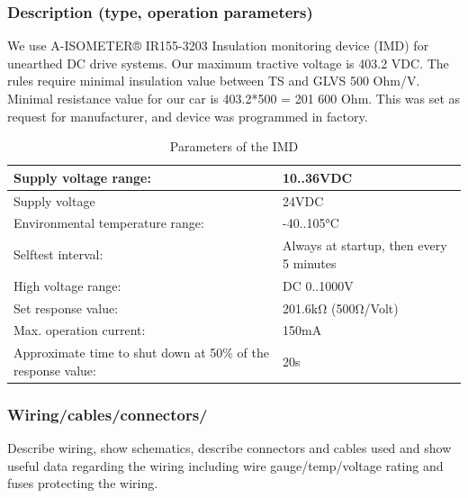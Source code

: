 \subsubsection{Description (type, operation parameters)}

We use A-ISOMETER® IR155-3203 Insulation monitoring device (IMD) for unearthed DC drive systems. Our maximum tractive voltage is 403.2 VDC. The rules require minimal insulation value between TS and GLVS 500 Ohm/V. Minimal resistance value for our car is 403.2*500 = 201 600 Ohm. This was set as request for manufacturer, and device was programmed in factory.
\begin{table}[H]
	\centering
	\caption{Parameters of the IMD}
	\begin{tabularx}{\textwidth}{|X|l|}
	 \hline	Supply voltage range: & 10..36VDC \\[.4cm]
	 \hline	Supply voltage & 24VDC \\[.4cm]
	 \hline	Environmental temperature range: & -40..105°C \\[.4cm]
	 \hline	Selftest interval: & Always at startup, then every 5 minutes \\[.4cm]
	 \hline	High voltage range: & DC 0..1000V \\[.4cm]
	 \hline	Set response value: & 201.6kΩ (500Ω/Volt) \\[.4cm]
	 \hline	Max. operation current: & 150mA \\[.4cm]
	 \hline	Approximate time to shut down at 50\% of the response value: & 20s \\[.4cm]
	  \hline
	\end{tabularx}%
	\label{tab:IMD}%
\end{table}%

\subsubsection{Wiring/cables/connectors/}
 Describe wiring, show schematics, describe connectors and cables used and show useful data regarding the wiring including wire gauge/temp/voltage rating and fuses protecting the wiring. 

